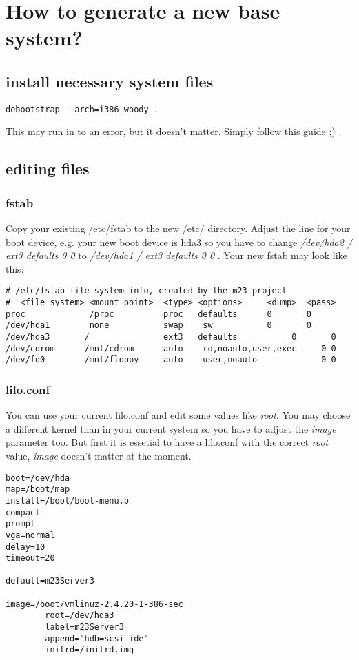 \section{How to generate a new base system?}

\subsection{install necessary system files}
\begin{verbatim}
debootstrap --arch=i386 woody .
\end{verbatim}
This may run in to an error, but it doesn't matter. Simply follow this guide ;) .

\subsection{editing files}
\subsubsection{fstab}
Copy your existing /etc/fstab to the new /etc/ directory. Adjust the line for your boot device, e.g. your new boot device is hda3 so you have to change \textit{/dev/hda2       /               ext3   defaults           0       0} to \textit{/dev/hda1       /               ext3   defaults           0       0} .
Your new fstab may look like this:
\begin{verbatim}
# /etc/fstab file system info, created by the m23 project
#  <file system> <mount point>  <type> <options>     <dump>  <pass>
proc             /proc          proc   defaults      0       0
/dev/hda1        none           swap    sw           0       0
/dev/hda3       /               ext3   defaults           0       0
/dev/cdrom      /mnt/cdrom      auto    ro,noauto,user,exec     0 0
/dev/fd0        /mnt/floppy     auto    user,noauto             0 0
\end{verbatim} 

\subsubsection{lilo.conf}
You can use your current lilo.conf and edit some values like \textit{root}. You may choose a different kernel than in your current system so you have to adjust the \textit{image} parameter too. But first it is essetial to have a lilo.conf with the correct \textit{root} value, \textit{image} doesn't matter at the moment.
\begin{verbatim}
boot=/dev/hda
map=/boot/map
install=/boot/boot-menu.b
compact
prompt
vga=normal
delay=10
timeout=20

default=m23Server3

image=/boot/vmlinuz-2.4.20-1-386-sec
        root=/dev/hda3
        label=m23Server3
        append="hdb=scsi-ide"
        initrd=/initrd.img
\end{verbatim}

